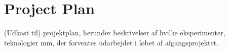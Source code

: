 \chapter{Project Plan}
(Udkast til) projektplan, herunder beskrivelser af hvilke eksperimenter, teknologier mm, der forventes udarbejdet i løbet af afgangsprojektet.